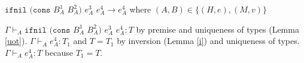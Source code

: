 \begin{case}
$\mathtt{ifnil}$ $(\mathtt{cons}$ $B_{A}^{1}$ $B_{A}^{2})$ $e_{A}^{3}$ $e_{A}^{4}\rightarrow e_{A}^{4}$ where $(A,B)\in\lbrace(H,e),(M,v)\rbrace$

$\Gamma\vdash_{A}\mathtt{ifnil}$ $(\mathtt{cons}$ $B_{A}^{1}$ $B_{A}^{2})$ $e_{A}^{3}$ $e_{A}^{4}:T$ by premise and uniqueness of types (Lemma \ref{uot}).  $\Gamma\vdash_{A}e_{A}^{4}:T_{1}$ and $T=T_{1}$ by inversion (Lemma \ref{i}) and uniqueness of types.  $\Gamma\vdash_{A}e_{A}^{4}:T$ because $T_{1}=T$.
\end{case}